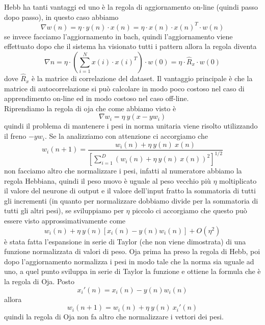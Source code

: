 \noindent Hebb ha tanti vantaggi ed uno è la regola di aggiornamento on-line (quindi passo dopo passo), in questo caso abbiamo
\begin{equation}
\nabla w(n)= \eta\cdot y(n) \cdot x(n)= \eta \cdot x(n) \cdot x(n)^T \cdot w(n)
\end{equation}
se invece facciamo l'aggiornamento in bach, quindi l'aggiornamento viene effettuato dopo che il sistema ha visionato tutti i pattern allora la regola diventa
\begin{equation}
\nabla n = \eta \cdot \left( \sum_{i=1}^N x(i) \cdot x(i)^T \right) \cdot w(0) = \eta \cdot \hat{R}_x \cdot w(0)
\end{equation}
dove $\hat{R}_x$ è la matrice di correlazione del dataset.  Il vantaggio principale è che la matrice di autocorrelazione si può calcolare in modo poco costoso nel caso di apprendimento on-line ed in modo costoso nel caso off-line.\\
\noindent Riprendiamo la regola di oja che come abbiamo visto è
\begin{equation}
\nabla w_i = \eta  \ y(x - y w_i)
\end{equation}
quindi il problema di mantenere i pesi in norma unitaria viene risolto utilizzando il freno $-y w_i$. Se la analizziamo con attenzione ci accorgiamo che 
\begin{equation}
w_i(n+1) = \frac{w_i(n) + \eta \ y(n) \ x(n)}{\left[ \sum_{i=1}^D (w_i(n) + \eta \ y(n) \ x(n))^2 \right]^{1/2}}
\end{equation}
non facciamo altro che normalizzare i pesi, infatti al numeratore abbiamo la regola Hebbiana, quindi il peso nuovo è uguale al peso vecchio più $\eta$ moltiplicato il valore del neurone di output e il valore dell'input fratto la sommatoria di tutti gli incrementi (in quanto per normalizzare dobbiamo divide per la sommatoria di tutti gli altri pesi), se sviluppiamo per $\eta$ piccolo ci accorgiamo che questo può essere visto approssimativamente come   
\begin{equation}
w_i(n) + \eta \ y(n) [ x_i(n) - y(n) w_i(n) ] + O(\eta^2)
\end{equation}
è stata fatta l'espansione in serie di Taylor (che non viene dimostrata) di una funzione normalizzata di valori di peso. Oja prima ha preso la regola di Hebb, poi dopo l'aggiornamento normalizza i pesi in modo tale che la norma sia uguale ad uno, a quel punto sviluppa in serie di Taylor la funzione e ottiene la formula che è la regola di Oja. Posto
\begin{equation}
x_i'(n) = x_i(n) - y(n) w_i(n)
\end{equation}
allora
\begin{equation}
w_i(n+1) = w_i(n) + \eta \ y(n) \ x_i'(n)
\end{equation}
quindi la regola di Oja non fa altro che normalizzare i vettori dei pesi.\\

